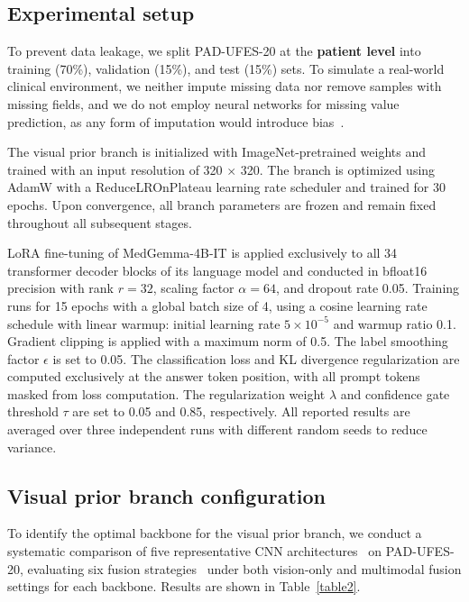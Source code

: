 \documentclass[preprint,12pt]{elsarticle}
\makeatletter
\def@NAT@last@yr{--\NAT@penalty}%
\makeatother
\begin{document}
\subsection{Experimental setup}
\label{4.3}
To prevent data leakage, we split PAD-UFES-20 at the \textbf{patient level} into training (70\%), validation (15\%), and test (15\%) sets. To simulate a real-world clinical environment, we neither impute missing data nor remove samples with missing fields, and we do not employ neural networks for missing value prediction, as any form of imputation would introduce bias~\cite{vo2026explainability,ryan2025does,el2026moving}.


The visual prior branch is initialized with ImageNet-pretrained weights and trained with an input resolution of 320 $\times$ 320. The branch is optimized using AdamW with a ReduceLROnPlateau learning rate scheduler and trained for 30 epochs. Upon convergence, all branch parameters are frozen and remain fixed throughout all subsequent stages.


LoRA fine-tuning of MedGemma-4B-IT is applied exclusively to all 34 transformer decoder blocks of its language model and conducted in bfloat16 precision with rank $r = 32$, scaling factor $\alpha = 64$, and dropout rate 0.05. Training runs for 15 epochs with a global batch size of 4, using a cosine learning rate schedule with linear warmup: initial learning rate $5 \times 10^{-5}$ and warmup ratio 0.1. Gradient clipping is applied with a maximum norm of 0.5. The label smoothing factor $\epsilon$ is set to 0.05. The classification loss and KL divergence regularization are computed exclusively at the answer token position, with all prompt tokens masked from loss computation. The regularization weight $\lambda$ and confidence gate threshold $\tau$ are set to 0.05 and 0.85, respectively. All reported results are averaged over three independent runs with different random seeds to reduce variance. 

\subsection{Visual prior branch configuration}
To identify the optimal backbone for the visual prior branch, we conduct a systematic comparison of five representative CNN architectures~\cite{simonyan2014very,he2016deep,tan2019efficientnet,sandler2018mobilenetv2,huang2017densely} on PAD-UFES-20, evaluating six fusion strategies~\cite{pacheco2020impact,khurshid2025multimodal,li2020fusing,pacheco2021attention,khurshid2024optimizing} under both vision-only and multimodal fusion settings for each backbone. Results are shown in Table~\ref{table2}.
\end{document}
